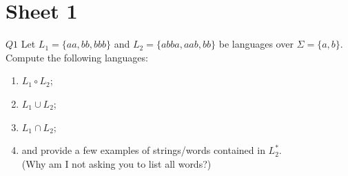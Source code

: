 \documentclass{article}
\theoremstyle{definition}
\theoremstyle{definition}
\theoremstyle{remark}
\begin{document}
\newpage
\pagestyle{main}

\section{Sheet 1}

\begin{questionbox}{$Q1$}
    Let $L_1=\{aa,bb,bbb\}$ and $L_2=\{abba,aab,bb\}$ be languages over $\Sigma=\{a,b\}$. Compute the following languages:
        
    \begin{enumerate}
        \item[$(i)$] $L_1\circ L_2$;
        
        \item[$(ii)$] $L_1\cup L_2$;

        \item[$(iii)$] $L_1\cap L_2$;

        \item[$(iv)$] and provide a few examples of strings/words contained in $L_2^\ast$.\\
        (Why am I not asking you to list all words?)
    \end{enumerate}

\end{questionbox}

\bigskip
\end{document}
